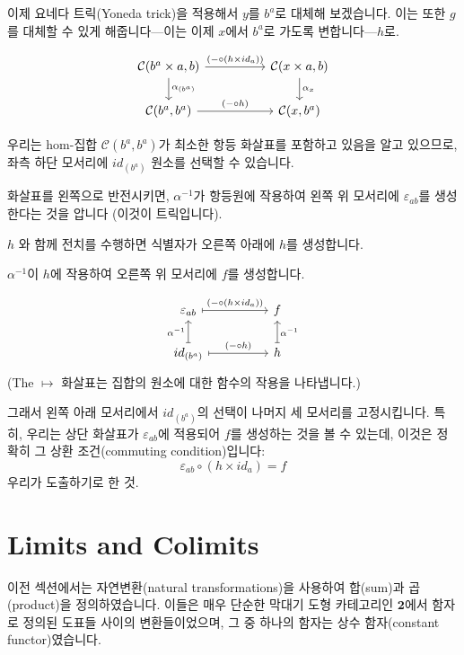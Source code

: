 \documentclass[DaoFP]{subfiles}
\begin{document}
이제 요네다 트릭(Yoneda trick)을 적용해서 $y$를 $b^a$로 대체해 보겠습니다. 이는 또한 $g$를 대체할 수 있게 해줍니다---이는 이제 $x$에서 $b^a$로 가도록 변합니다---$h$로.

\[
 \begin{tikzcd}
 \mathcal{C}(b^a \times a, b)
 \arrow[rr, "(- \circ (h \times id_a))"]
 \arrow[d,  "\alpha_{(b^a)}"]
& &
\mathcal{C}(x \times a, b)
  \arrow[d,  "\alpha_x"]
 \\
 \mathcal{C}(b^a, b^a)
 \arrow[rr, "(- \circ h)"]
& &
\mathcal{C}(x, b^a)
 \end{tikzcd}
\]

우리는 hom-집합 $\mathcal{C}(b^a, b^a)$가 최소한 항등 화살표를 포함하고 있음을 알고 있으므로, 좌측 하단 모서리에 $id_{(b^a)}$ 원소를 선택할 수 있습니다.

화살표를 왼쪽으로 반전시키면, $\alpha^{-1}$가 항등원에 작용하여 왼쪽 위 모서리에 $\varepsilon_{a b}$를 생성한다는 것을 압니다 (이것이  트릭입니다).

$h$ 와 함께 전치를 수행하면 식별자가 오른쪽 아래에 $h$를 생성합니다.

$\alpha^{-1}$이 $h$에 작용하여 오른쪽 위 모서리에 $f$를 생성합니다.

\[
 \begin{tikzcd}[
  every arrow/.style={draw,mapsto}
]
 \varepsilon_{a b}
 \arrow[rr, "(- \circ (h \times id_a))"]
& &
f
 \\
 id_{(b^a)}
 \arrow[u, "\alpha^{-1}"]
 \arrow[rr, "(- \circ h)"]
& &
h
\arrow[u, "\alpha^{-1}"']
 \end{tikzcd}
\]
(The $\mapsto$ 화살표는 집합의 원소에 대한 함수의 작용을 나타냅니다.)


그래서 왼쪽 아래 모서리에서 $id_{(b^a)}$의 선택이 나머지 세 모서리를 고정시킵니다. 특히, 우리는 상단 화살표가 $\varepsilon_{a b}$에 적용되어 $f$를 생성하는 것을 볼 수 있는데, 이것은 정확히 그 상환 조건(commuting condition)입니다:
\[ \varepsilon_{a b} \circ (h \times id_a) = f \]
우리가 도출하기로 한 것.

\section{Limits and Colimits}

이전 섹션에서는 자연변환(natural transformations)을 사용하여 합(sum)과 곱(product)을 정의하였습니다. 이들은 매우 단순한 막대기 도형 카테고리인 $\mathbf{2}$에서 함자로 정의된 도표들 사이의 변환들이었으며, 그 중 하나의 함자는 상수 함자(constant functor)였습니다.
\end{document}
